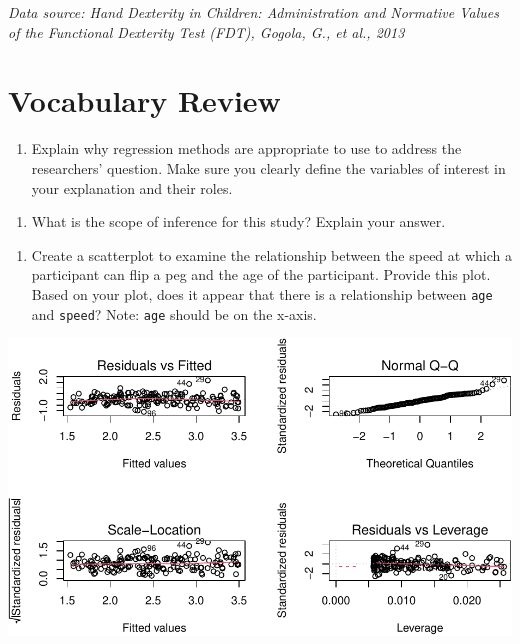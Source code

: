 \documentclass[
]{report}
\providecommand{\tightlist}{%
  \setlength{\itemsep}{0pt}\setlength{\parskip}{0pt}}
\begin{document}
\emph{Data source: Hand Dexterity in Children: Administration and Normative Values of the Functional Dexterity Test (FDT), Gogola, G., et al., 2013}

\hypertarget{vocabulary-review-5}{%
\section{Vocabulary Review}\label{vocabulary-review-5}}

\begin{enumerate}
\def\labelenumi{\arabic{enumi}.}
\tightlist
\item
  Explain why regression methods are appropriate to use to address the researchers' question. Make sure you clearly define the variables of interest in your explanation and their roles.
\end{enumerate}

\vspace{1in}

\begin{enumerate}
\def\labelenumi{\arabic{enumi}.}
\setcounter{enumi}{1}
\tightlist
\item
  What is the scope of inference for this study? Explain your answer.
\end{enumerate}

\vspace{1in}

\begin{enumerate}
\def\labelenumi{\arabic{enumi}.}
\setcounter{enumi}{2}
\tightlist
\item
  Create a scatterplot to examine the relationship between the speed at which a participant can flip a peg and the age of the participant. Provide this plot. Based on your plot, does it appear that there is a relationship between \texttt{age} and \texttt{speed}? Note: \texttt{age} should be on the x-axis.
\end{enumerate}

\begin{center}\includegraphics[width=0.7\linewidth]{10-regression_files/figure-latex/unnamed-chunk-2-1} \end{center}
\end{document}
